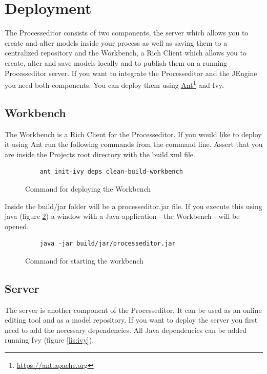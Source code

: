 \section{Deployment}

The Processeditor consists of two components, the server which allows you to create and alter models inside your process as well as saving them to a centralized repository and the Workbench, a Rich Client which allows you to create, alter and save models locally and to publish them on a running Processeditor server.
If you want to integrate the Processeditor and the JEngine you need both components.
You can deploy them using \href{https://ant.apache.org}{Ant}\footnote{\url{https://ant.apache.org}} and Ivy.

\subsection{Workbench}

The Workbench is a Rich Client for the Processeditor.
If you would like to deploy it using Ant run the following commands from the command line. Assert that you are inside the Projects root directory with the build.xml file.

\begin{figure}[h!]
\begin{verbatim}
	ant init-ivy deps clean-build-workbench
\end{verbatim}
\caption{Command for deploying the Workbench}
\label{lis:depw}
\end{figure}

Inside the build/jar folder will be a processeditor.jar file. If you execute this using java (figure \ref{lis:startworkbench}) a window with a Java application - the Workbench - will be opened.


\begin{figure}[h!]
\begin{verbatim}
	java -jar build/jar/processeditor.jar
\end{verbatim}
\caption{Command for starting the workbench}
\label{lis:startworkbench}
\end{figure}

\subsection{Server}

The server is another component of the Processeditor. It can be used as an online editing tool and as a model repository.
If you want to deploy the server you first need to add the necessary dependencies. All Java dependencies can be added running Ivy (figure \ref{lis:ivy}).


